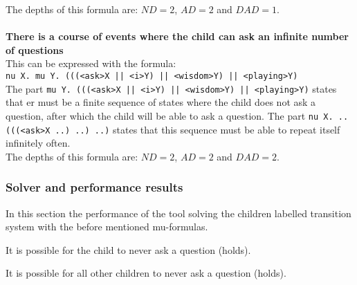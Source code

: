 \documentclass[10pt,a4paper]{article}
\begin{document}
The depths of this formula are: $ND = 2$, $AD = 2$ and $DAD = 1$.
\\\\
\textbf{There is a course of events where the child can ask an infinite number of questions}\\
This can be expressed with the formula:\\
{\tt nu X. mu Y. (((<ask>X || <i>Y) || <wisdom>Y) || <playing>Y)}\\
The part {\tt mu Y. (((<ask>X || <i>Y) || <wisdom>Y) || <playing>Y)} states that er must be a finite sequence of states where the child does not ask a question, after which the child will be able to ask a question. The part {\tt nu X. .. (((<ask>X ..) ..) ..)} states that this sequence must be able to repeat itself infinitely often.\\
The depths of this formula are: $ND = 2$, $AD = 2$ and $DAD = 2$.

\subsubsection{Solver and performance results}

In this section the performance of the tool solving the children labelled transition system with the before mentioned mu-formulas.

It is possible for the child to never ask a question (holds).


It is possible for all other children to never ask a question (holds).

\end{document}
